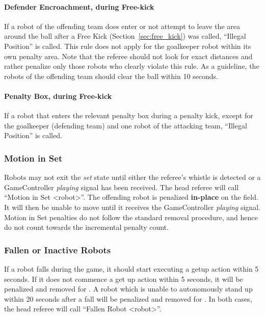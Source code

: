 \paragraph{Defender Encroachment, during Free-kick}

If a robot of the offending team does enter or not attempt to leave the \FreeKickRadius area around the ball after a Free Kick (\cf Section~\ref{sec:free_kick}) was called, ``Illegal Position'' is called. This rule does not apply for the goalkeeper robot within its own penalty area. Note that the referee should not look for exact distances and rather penalize only those robots who clearly violate this rule. As a guideline, the robots of the offending team should clear the ball within 10 seconds.

\paragraph{Penalty Box, during Free-kick}

If a robot that enters the relevant penalty box during a penalty kick, except for the goalkeeper (defending team) and one robot of the attacking team, ``Illegal Position'' is called.


\subsubsection{Motion in Set}
\label{sec:motion_in_set}

Robots may not exit the \textit{set} state until either the referee's whistle is detected or a GameController \textit{playing} signal has been received.
The head referee will call ``Motion in Set \textless robot\textgreater''.
The offending robot is penalized \textbf{in-place} on the field. It will then be unable to move until it receives the GameController \textit{playing} signal. Motion in Set penalties do not follow the standard removal procedure, and hence do not count towards the incremental penalty count.

\subsubsection{Fallen or Inactive Robots}
\label{sec:fallenrobots}

If a robot falls during the game, it should start executing a getup action within 5 seconds. If it does not commence a get up action within 5 seconds, it will be penalized and removed for \StandardPenaltyTime.
A robot which is unable to autonomously stand up within 20 seconds after a fall  will be penalized and removed for \StandardPenaltyTime. 
In both cases, the head referee will call ``Fallen Robot  \textless robot\textgreater''.

